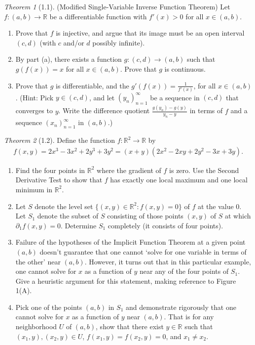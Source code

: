 \documentclass[12pt]{article}
\theoremstyle{remark}
\theoremstyle{named}
\newtheorem*{theorem}{Theorem}
\newcommand{\R}{\mathbb R}
\begin{document}
\begin{theorem}[1.1]
    (Modified Single-Variable Inverse Function Theorem) Let \(f : (a, b) \to \R\) be a differentiable function with \(f'(x) > 0\) for all \(x \in (a, b)\).
    \begin{enumerate}
        \item Prove that \(f\) is injective, and argue that its image must be an open interval \((c, d)\) (with \(c\) and/or \(d\) possibly infinite).
        \item By part (a), there exists a function \(g : (c, d) \to (a, b)\) such that \(g(f(x)) = x\) for all \(x \in (a, b)\). Prove that \(g\) is continuous.
        \item Prove that \(g\) is differentiable, and the \(g'(f(x)) = \frac{1}{f'(x)}\), for all \(x \in (a, b)\). (Hint: Pick \(y \in (c, d)\), and let \((y_n)_{n = 1}^\infty\) be a sequence in \((c, d)\) that converges to \(y\). Write the difference quotient \(\frac{g(y_n) - g(y)}{y_n - y}\) in terms of \(f\) and a sequence \((x_n)_{n = 1}^\infty\) in \((a, b)\).)
    \end{enumerate}
\end{theorem}

\begin{theorem}[1.2]
    Define the function \(f : \R^2 \to \R\) by 
    \begin{align*}
        f(x, y) = 2x^3 - 3x^2 + 2y^3 + 3y^2 = (x + y)(2x^2 - 2xy + 2y^2 - 3x + 3y).
    \end{align*}
    \begin{enumerate}
        \item Find the four points in \(\R^2\) where the gradient of \(f\) is zero. Use the Second Derivative Test to show that \(f\) has exactly one local maximum and one local minimum in \(\R^2\). 
        \item Let \(S\) denote the level set \(\{(x, y) \in \R^2 : f(x, y) = 0\}\) of \(f\) at the value \(0\). Let \(S_1\) denote the subset of \(S\) consisting of those points \((x, y)\) of \(S\) at which \(\partial_1 f(x, y) = 0\). Determine \(S_1\) completely (it consists of four points).
        \item Failure of the hypotheses of the Implicit Function Theorem at a given point \((a, b)\) doesn't guarantee that one cannot `solve for one variable in terms of the other' near \((a, b)\). However, it turns out that in this particular example, one cannot solve for \(x\) as a function of \(y\) near any of the four points of \(S_1\). Give a heuristic argument for this statement, making reference to Figure 1(A).
        \item Pick one of the points \((a, b)\) in \(S_1\) and demonstrate rigorously that one cannot solve for \(x\) as a function of \(y\) near \((a, b)\). That is for any neighborhood \(U\) of \((a, b)\), show that there exist \(y \in \R\) such that \((x_1, y), (x_2, y) \in U\), \(f(x_1, y) = f(x_2, y) = 0\), and \(x_1 \neq x_2\). 
    \end{enumerate}
\end{theorem}
\end{document}
